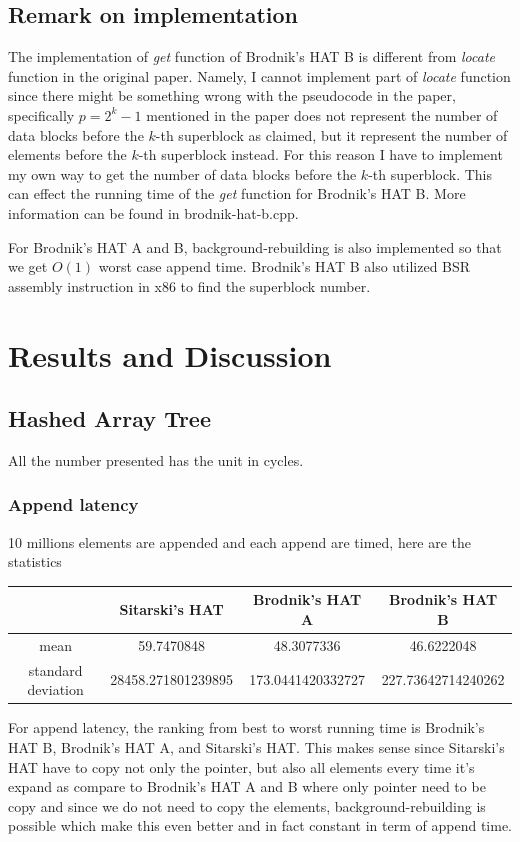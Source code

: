 \documentclass{article} %
\begin{document}
    \subsection*{Remark on implementation}
    The implementation of \emph{get} function of Brodnik's HAT B is different from \emph{locate} function in the original paper.
    Namely, I cannot implement part of \emph{locate} function since there might be something wrong with the pseudocode in the paper,
    specifically \emph{$p=2^k - 1$} mentioned in the paper does not represent the number of data blocks before the $k$-th superblock as claimed,
    but it represent the number of elements before the $k$-th superblock instead. For this reason I have to implement my own way to get the number of
    data blocks before the $k$-th superblock. This can effect the running time of the \emph{get} function for Brodnik's HAT B. More information can be found in brodnik-hat-b.cpp.

    For Brodnik's HAT A and B, background-rebuilding is also implemented so that we get $O(1)$ worst case append time. Brodnik's HAT B also utilized BSR assembly instruction in x86 to find
    the superblock number.

    \section*{Results and Discussion}
    \subsection*{Hashed Array Tree}
    All the number presented has the unit in cycles.
    \subsubsection*{Append latency}
    10 millions elements are appended and each append are timed, here are the statistics
    \begin{center}
        \begin{tabular}{|c|c|c|c|}\hline
        & Sitarski's HAT & Brodnik's HAT A & Brodnik's HAT B\\\hline
        mean &  59.7470848 & 48.3077336 & 46.6222048\\\hline
        standard deviation & 28458.271801239895  & 173.0441420332727 & 227.73642714240262\\\hline
        \end{tabular}
    \end{center}
    For append latency, the ranking from best to worst running time is Brodnik's HAT B, Brodnik's HAT A, and Sitarski's HAT.
    This makes sense since Sitarski's HAT have to copy not only the pointer, but also all elements every time it's expand as compare to Brodnik's HAT A
    and B where only pointer need to be copy and since we do not need to copy the elements, background-rebuilding is possible which make this even better and in fact constant in term of append time.
\end{document}
